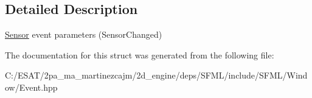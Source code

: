 \subsection{Detailed Description}
\hyperlink{classsf_1_1_sensor}{Sensor} event parameters (Sensor\+Changed) 

The documentation for this struct was generated from the following file\+:\begin{DoxyCompactItemize}
\item 
C\+:/\+E\+S\+A\+T/2pa\+\_\+ma\+\_\+martinezcajm/2d\+\_\+engine/deps/\+S\+F\+M\+L/include/\+S\+F\+M\+L/\+Window/Event.\+hpp\end{DoxyCompactItemize}
